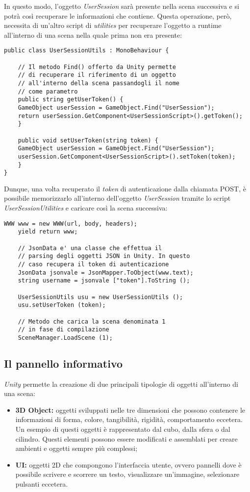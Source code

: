 In questo modo, l'oggetto \textit{UserSession} sarà presente nella scena successiva e si potrà così recuperare le informazioni che contiene. Questa operazione, però, necessita di un'altro script di \textit{utilities} per recuperare l'oggetto a runtime all'interno di una scena nella quale prima non era presente:

\begin{lstlisting}[style=MyCStyle]
public class UserSessionUtils : MonoBehaviour {

	// Il metodo Find() offerto da Unity permette 
	// di recuperare il riferimento di un oggetto
	// all'interno della scena passandogli il nome
	// come parametro
	public string getUserToken() {
	GameObject userSession = GameObject.Find("UserSession");
	return userSession.GetComponent<UserSessionScript>().getToken();
	}

	public void setUserToken(string token) {
	GameObject userSession = GameObject.Find("UserSession");
	userSession.GetComponent<UserSessionScript>().setToken(token);
	}
}
\end{lstlisting}

Dunque, una volta recuperato il \textit{token} di autenticazione dalla chiamata POST, è possibile memorizzarlo all'interno dell'oggetto \textit{UserSession} tramite lo script \textit{UserSessionUtilities} e caricare così la scena successiva:

\begin{lstlisting}[style=MyCStyle]
	WWW www = new WWW(url, body, headers);
	yield return www;
	
	// JsonData e' una classe che effettua il  
	// parsing degli oggetti JSON in Unity. In questo  
	// caso recupera il token di autenticazione
	JsonData jsonvale = JsonMapper.ToObject(www.text);
	string username = jsonvale ["token"].ToString ();
	
	UserSessionUtils usu = new UserSessionUtils ();
	usu.setUserToken (token);
	
	// Metodo che carica la scena denominata 1
	// in fase di compilazione
	SceneManager.LoadScene (1);
\end{lstlisting}

\subsection{Il pannello informativo}
\textit{Unity} permette la creazione di due principali tipologie di oggetti all'interno di una scena:

\begin{itemize}
	\item \textbf{3D Object:} oggetti sviluppati nelle tre dimensioni che possono contenere le informazioni di forma, colore, tangibilità, rigidità, comportamento eccetera. \\
	Un esempio di questi oggetti è rappresentato dal cubo, dalla sfera o dal cilindro. Questi elementi possono essere modificati e assemblati per creare ambienti e oggetti sempre più complessi;
	\item \textbf{UI:} oggetti 2D che compongono l'interfaccia utente, ovvero pannelli dove è possibile scrivere e scorrere un testo, visualizzare un'immagine, selezionare pulsanti eccetera.
\end{itemize}

